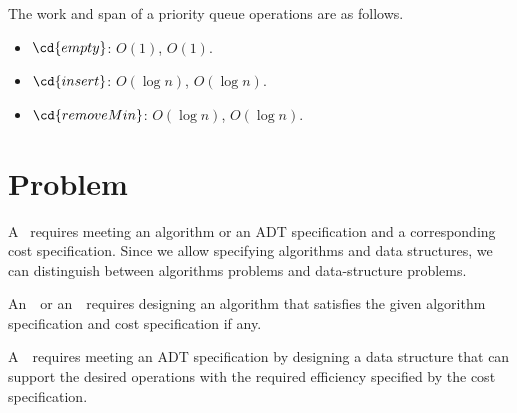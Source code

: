 \begin{cluster}
\label{grp:cst:introduction::spec::priority-queue-basic}

\begin{costspec}
\label{cst:introduction::spec::priority-queue-basic}
The work and span of a priority queue operations are as follows.
\begin{itemize}
\item $\cd{empty}$: $O(1)$, $O(1)$.
\item $\cd{insert}$: $O(\log{n})$, $O(\log{n})$.
\item $\cd{removeMin}$: $O(\log{n})$, $O(\log{n})$.
\end{itemize}

\end{costspec}
\end{cluster}


\section{Problem}
\label{sec:introduction::spec::problem}

\begin{cluster}
\label{grp:grm:introduction::spec::requires}

\begin{gram}
\label{grm:introduction::spec::requires}
A~ requires meeting an algorithm or an ADT specification
and a corresponding cost specification.
Since we allow specifying algorithms and data structures, we can
distinguish between algorithms problems and data-structure problems.

\end{gram}
\end{cluster}

\begin{cluster}
\label{grp:def:intro::spec::algorithmic-problem}

\begin{definition}
\label{def:intro::spec::algorithmic-problem}
An~~or an~~requires
designing an algorithm that satisfies the given algorithm
specification and cost specification if any.

\end{definition}
\end{cluster}

\begin{cluster}
\label{grp:def:intro::spec::ds-problem}

\begin{definition}
\label{def:intro::spec::ds-problem}

A~~requires meeting an ADT
specification by designing a data structure that can
support the desired operations with the required efficiency specified
by the cost specification.

\end{definition}
\end{cluster}


